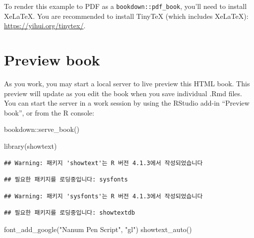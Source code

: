 \documentclass[
]{book}
\newenvironment{Shaded}{\begin{snugshade}}{\end{snugshade}}
\newcommand{\FunctionTok}[1]{\textcolor[rgb]{0.00,0.00,0.00}{#1}}
\newcommand{\NormalTok}[1]{#1}
\newcommand{\SpecialCharTok}[1]{\textcolor[rgb]{0.00,0.00,0.00}{#1}}
\newcommand{\StringTok}[1]{\textcolor[rgb]{0.31,0.60,0.02}{#1}}
\theoremstyle{definition}
\theoremstyle{definition}
\theoremstyle{definition}
\theoremstyle{definition}
\theoremstyle{remark}
\begin{document}
To render this example to PDF as a \texttt{bookdown::pdf\_book}, you'll need to install XeLaTeX. You are recommended to install TinyTeX (which includes XeLaTeX): \url{https://yihui.org/tinytex/}.

\hypertarget{preview-book}{%
\section{Preview book}\label{preview-book}}

As you work, you may start a local server to live preview this HTML book. This preview will update as you edit the book when you save individual .Rmd files. You can start the server in a work session by using the RStudio add-in ``Preview book'', or from the R console:

\begin{Shaded}
\begin{Highlighting}[]
\NormalTok{bookdown}\SpecialCharTok{::}\FunctionTok{serve\_book}\NormalTok{()}
\end{Highlighting}
\end{Shaded}

\begin{Shaded}
\begin{Highlighting}[]
\FunctionTok{library}\NormalTok{(showtext)}
\end{Highlighting}
\end{Shaded}

\begin{verbatim}
## Warning: 패키지 'showtext'는 R 버전 4.1.3에서 작성되었습니다
\end{verbatim}

\begin{verbatim}
## 필요한 패키지를 로딩중입니다: sysfonts
\end{verbatim}

\begin{verbatim}
## Warning: 패키지 'sysfonts'는 R 버전 4.1.3에서 작성되었습니다
\end{verbatim}

\begin{verbatim}
## 필요한 패키지를 로딩중입니다: showtextdb
\end{verbatim}

\begin{Shaded}
\begin{Highlighting}[]
\FunctionTok{font\_add\_google}\NormalTok{(}\StringTok{"Nanum Pen Script"}\NormalTok{, }\StringTok{"gl"}\NormalTok{)}
\FunctionTok{showtext\_auto}\NormalTok{()}
\end{Highlighting}
\end{Shaded}
\end{document}
